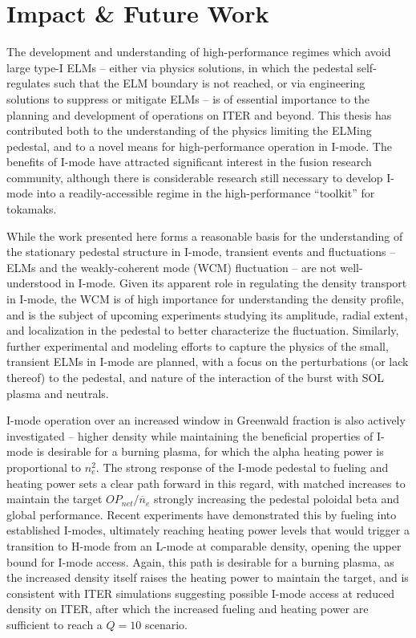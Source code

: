 \documentclass[ twoside,openright,titlepage,numbers=noenddot,headinclude,%
                footinclude=true,cleardoublepage=empty,abstractoff, %
                BCOR=5mm,paper=letter,fontsize=11pt,%
                ngerman,american,%
                ]{scrreprt}
\begin{document}
\section*{Impact \& Future Work}

The development and understanding of high-performance regimes which avoid large type-I ELMs -- either via physics solutions, in which the pedestal self-regulates such that the ELM boundary is not reached, or via engineering solutions to suppress or mitigate ELMs -- is of essential importance to the planning and development of operations on ITER and beyond.  This thesis has contributed both to the understanding of the physics limiting the ELMing pedestal, and to a novel means for high-performance operation in I-mode.  The benefits of I-mode have attracted significant interest in the fusion research community, although there is considerable research still necessary to develop I-mode into a readily-accessible regime in the high-performance ``toolkit'' for tokamaks.

While the work presented here forms a reasonable basis for the understanding of the stationary pedestal structure in I-mode, transient events and fluctuations -- ELMs and the weakly-coherent mode (WCM) fluctuation -- are not well-understood in I-mode.  Given its apparent role in regulating the density transport in I-mode, the WCM is of high importance for understanding the density profile, and is the subject of upcoming experiments studying its amplitude, radial extent, and localization in the pedestal to better characterize the fluctuation.  Similarly, further experimental and modeling efforts to capture the physics of the small, transient ELMs in I-mode are planned, with a focus on the perturbations (or lack thereof) to the pedestal, and nature of the interaction of the burst with SOL plasma and neutrals.

I-mode operation over an increased window in Greenwald fraction is also actively investigated -- higher density while maintaining the beneficial properties of I-mode is desirable for a burning plasma, for which the alpha heating power is proportional to $n_e^2$.  The strong response of the I-mode pedestal to fueling and heating power sets a clear path forward in this regard, with matched increases to maintain the target $OP_{net}/\overline{n}_e$ strongly increasing the pedestal poloidal beta and global performance.  Recent experiments have demonstrated this by fueling into established I-modes, ultimately reaching heating power levels that would trigger a transition to H-mode from an L-mode at comparable density, opening the upper bound for I-mode access.  Again, this path is desirable for a burning plasma, as the increased density itself raises the heating power to maintain the target, and is consistent with ITER simulations \cite{Whyte2011} suggesting possible I-mode access at reduced density on ITER, after which the increased fueling and heating power are sufficient to reach a $Q=10$ scenario.
\end{document}

